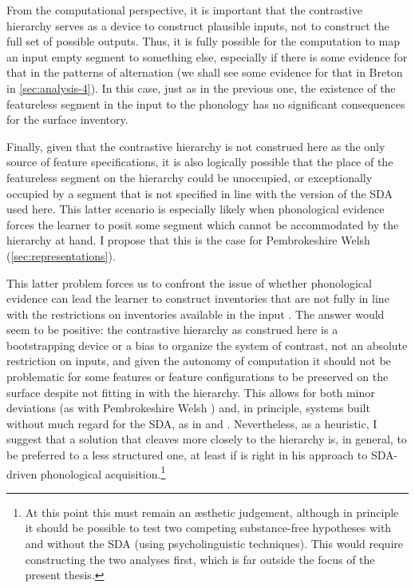 From the computational perspective, it is important that the contrastive hierarchy serves as a device to construct plausible inputs, not to construct the full set of possible outputs. Thus, it is fully possible for the computation to map an input empty segment to something else, especially if there is some evidence for that in the patterns of alternation (we shall see some evidence for that in Breton in \cref{sec:analysis-4}). In this case, just as in the previous one, the existence of the featureless segment in the input to the phonology has no significant consequences for the surface inventory.

Finally, given that the contrastive hierarchy is not construed here as the only source of feature specifications, it is also logically possible that the place of the featureless segment on the hierarchy could be unoccupied, or exceptionally occupied by a segment that is not specified in line with the version of the SDA used here. This latter scenario is especially likely when phonological evidence forces the learner to posit some segment which cannot be accommodated by the hierarchy at hand. I propose that this is the case for Pembrokeshire Welsh \ipa{[ŋ]} (\cref{sec:representations}).

This latter problem forces us to confront the issue of whether phonological evidence can lead the learner to construct inventories that are not fully in line with the restrictions on inventories available in the input \citep[as argued by][]{blaho-diss,kramer09:_italian}. The answer would seem to be positive: the contrastive hierarchy as construed here is a bootstrapping device or a bias to organize the system of contrast, not an absolute restriction on inputs, and given the autonomy of computation it should not be problematic for some features or feature configurations to be preserved on the surface despite not fitting in with the hierarchy. This allows for both minor deviations (as with Pembrokeshire Welsh \ipa{[ŋ]}) and, in principle, systems built without much regard for the SDA, as in \citet{blaho-diss} and \citet{kramer09:_italian}. Nevertheless, as a heuristic, I suggest that a solution that cleaves more closely to the hierarchy is, in general, to be preferred to a less structured one, at least if \citet{dresher09} is right in his approach to SDA\hyp driven phonological acquisition.\footnote{At this point this must remain an æsthetic judgement, although in principle it should be possible to test two competing substance\hyp free hypotheses with and without the SDA (\eg using psycholinguistic techniques). This would require constructing the two analyses first, which  is far outside the focus of the present thesis.}

